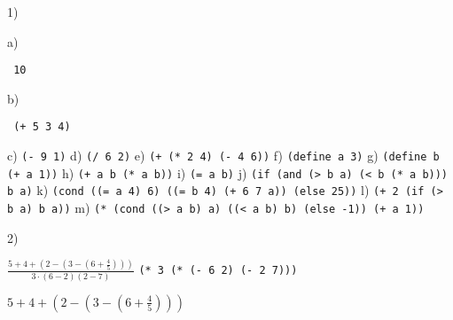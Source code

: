 \documentclass[a4paper,12pt]{article}
\begin{document}
1)

a) \begin{verbatim} 10 \end{verbatim}
b) \begin{verbatim} (+ 5 3 4) \end{verbatim}
c) \texttt{(- 9 1)}
d) \texttt{(/ 6 2)}
e) \texttt{(+ (* 2 4) (- 4 6))}
f) \texttt{(define a 3)}
g) \texttt{(define b (+ a 1))}
h) \texttt{(+ a b (* a b))}
i) \texttt{(= a b)}
j) \texttt{(if (and (> b a) (< b (* a b)))
    b
    a)}
k) \texttt{(cond ((= a 4) 6)
      ((= b 4) (+ 6 7 a))
      (else 25))}
l) \texttt{(+ 2 (if (> b a) b a))}
m) \texttt{(* (cond ((> a b) a)
         ((< a b) b)
         (else -1))
   (+ a 1))}

2)

$\frac{5 + 4 + (2 - (3 - (6 + \frac{4}{5})))}{3 \cdot (6 - 2)(2 - 7)}$ \rightarrow \texttt{(* 3 (* (- 6 2) (- 2 7)))}

$5+4+(2-(3-(6+\frac{4}{5})))$ 
\end{document}
